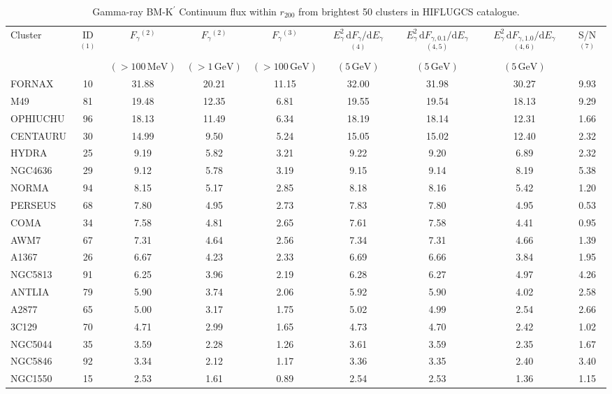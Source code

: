 \documentclass[10pt,aps,pra,reprint,amsmath,amsfonts,amssymb,showpacs,nofootinbib,floatfix]{revtex4-1}
\newcommand{\rmn}{\mathrm}
\newcommand{\Kp}{\rmn{K}^\prime}
\newcommand{\dd}{\rmn{d}}
\newcommand{\rvir}{r_{200}}
\newcommand{\eg}{E_\gamma}
\begin{document}
\begin{table}
\begin{minipage}{2.0\columnwidth}
  \caption{Gamma-ray BM-$\Kp$ Continuum flux within $\rvir$ from brightest 50 clusters in HIFLUGCS catalogue.}
\begin{tabular}{l c c c c c c c c}
\hline
\hline
 Cluster & ID$^{(1)}$ & $F_{\gamma}$$^{(2)}$ & $F_{\gamma}$$^{(2)}$&
 $F_{\gamma}$$^{(3)}$ & $\eg^2\,\dd F_{\gamma}/\dd \eg$$^{(4)}$ &
 $\eg^2\,\dd F_{\gamma,0.1}/\dd \eg$$^{(4,5)}$ &
 $\eg^2\,\dd F_{\gamma,1.0}/\dd \eg$$^{(4,6)}$ & S/N$^{(7)}$ \\
  & & $(>100\,\rmn{MeV})$ & $(>1\,\rmn{GeV})$ & $(>100\,\rmn{GeV})$ &
 $(5\,\rmn{GeV})$ & $(5\,\rmn{GeV})$ & $(5\,\rmn{GeV})$ & \\
 \hline
FORNAX & 10 & 31.88 & 20.21 & 11.15 & 32.00 & 31.98 & 30.27 & 9.93 \\
M49 & 81 & 19.48 & 12.35 & 6.81 & 19.55 & 19.54 & 18.13 & 9.29 \\
OPHIUCHU & 96 & 18.13 & 11.49 & 6.34 & 18.19 & 18.14 & 12.31 & 1.66 \\
CENTAURU & 30 & 14.99 & 9.50 & 5.24 & 15.05 & 15.02 & 12.40 & 2.32 \\
HYDRA & 25 & 9.19 & 5.82 & 3.21 & 9.22 & 9.20 & 6.89 & 2.32 \\
NGC4636 & 29 & 9.12 & 5.78 & 3.19 & 9.15 & 9.14 & 8.19 & 5.38 \\
NORMA & 94 & 8.15 & 5.17 & 2.85 & 8.18 & 8.16 & 5.42 & 1.20 \\
PERSEUS & 68 & 7.80 & 4.95 & 2.73 & 7.83 & 7.80 & 4.95 & 0.53 \\
COMA & 34 & 7.58 & 4.81 & 2.65 & 7.61 & 7.58 & 4.41 & 0.95 \\
AWM7 & 67 & 7.31 & 4.64 & 2.56 & 7.34 & 7.31 & 4.66 & 1.39 \\
A1367 & 26 & 6.67 & 4.23 & 2.33 & 6.69 & 6.66 & 3.84 & 1.95 \\
NGC5813 & 91 & 6.25 & 3.96 & 2.19 & 6.28 & 6.27 & 4.97 & 4.26 \\
ANTLIA & 79 & 5.90 & 3.74 & 2.06 & 5.92 & 5.90 & 4.02 & 2.58 \\
A2877 & 65 & 5.00 & 3.17 & 1.75 & 5.02 & 4.99 & 2.54 & 2.66 \\
3C129 & 70 & 4.71 & 2.99 & 1.65 & 4.73 & 4.70 & 2.42 & 1.02 \\
NGC5044 & 35 & 3.59 & 2.28 & 1.26 & 3.61 & 3.59 & 2.35 & 1.67 \\
NGC5846 & 92 & 3.34 & 2.12 & 1.17 & 3.36 & 3.35 & 2.40 & 3.40 \\
NGC1550 & 15 & 2.53 & 1.61 & 0.89 & 2.54 & 2.53 & 1.36 & 1.15 \\

\end{tabular}
\end{minipage}
\end{table}
\end{document}
